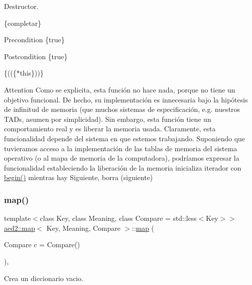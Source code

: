 Destructor. 

\{completar\}

\begin{DoxyPrecond}{Precondition}
\{true\} 
\end{DoxyPrecond}
\begin{DoxyPostcond}{Postcondition}
\{true\}
\end{DoxyPostcond}
\{((\{$\ast$this\}))\}

\begin{DoxyAttention}{Attention}
Como se explicita, esta función no hace nada, porque no tiene un objetivo funcional. De hecho, su implementación es innecesaria bajo la hipótesis de infinitud de memoria (que muchos sistemas de especificación, e.\+g. nuestros T\+A\+Ds, asumen por simplicidad). Sin embargo, esta función tiene un comportamiento real y es liberar la memoria usada. Claramente, esta funcionalidad depende del sistema en que estemos trabajando. Suponiendo que tuvieramos acceso a la implementación de las tablas de memoria del sistema operativo (o al mapa de memoria de la computadora), podríamos expresar la funcionalidad estableciendo la liberación de la memoria inicializa iterador con \hyperlink{classaed2_1_1map_a58a95705d54b3dda7f775ce5a22225cb}{begin()} mientras hay Siguiente, borra (siguiente) 
\end{DoxyAttention}
\mbox{\label{classaed2_1_1map_a64da1d965b13eb28cdb3837bc17a18cf}} 
\subsubsection{\texorpdfstring{map()}{map()}\hspace{0.1cm}{\footnotesize\ttfamily [4/6]}}
{\footnotesize\ttfamily template$<$class Key, class Meaning, class Compare = std\+::less$<$\+Key$>$$>$ \\
\hyperlink{classaed2_1_1map}{aed2\+::map}$<$ Key, Meaning, Compare $>$\+::\hyperlink{classaed2_1_1map}{map} (\begin{DoxyParamCaption}\item[{Compare}]{c = {\ttfamily Compare()} }\end{DoxyParamCaption})\hspace{0.3cm}{\ttfamily [inline]}, {\ttfamily [explicit]}}



Crea un diccionario vacio. 


